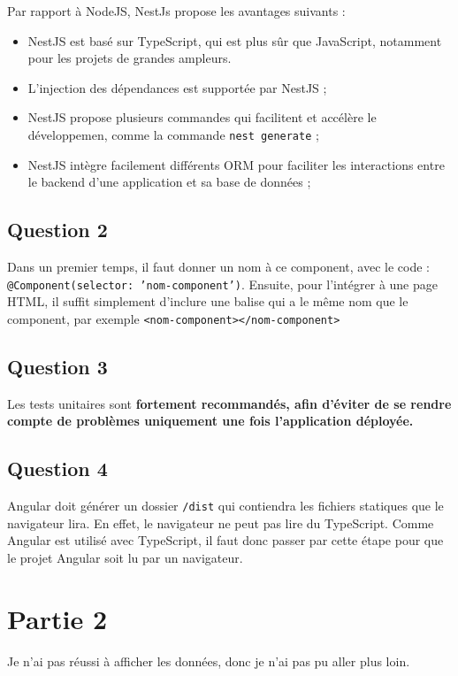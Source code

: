 \documentclass[12pt,a4paper]{article}
\begin{document}
Par rapport à NodeJS, NestJs propose les avantages suivants : \\

\begin{itemize}
	\item NestJS est basé sur TypeScript, qui est plus sûr que JavaScript, notamment pour les projets de grandes ampleurs.
	\item L'injection des dépendances est supportée par NestJS ;
	\item NestJS propose plusieurs commandes qui facilitent et accélère le développemen, comme la commande \texttt{nest generate} ;
	\item NestJS intègre facilement différents ORM pour faciliter les interactions entre le backend d'une application et sa base de données ;
\end{itemize}	
	
	\subsection*{Question 2}

Dans un premier temps, il faut donner un nom à ce component, avec le code : \\ \texttt{@Component({{selector: 'nom-component'})}}. Ensuite, pour l'intégrer à une page HTML, il suffit simplement d'inclure une balise qui a le même nom que le component, par exemple \texttt{<nom-component></nom-component>}
	
	\subsection*{Question 3}
	
Les tests unitaires sont \textbf{fortement recommandés, afin d’éviter de se rendre compte de problèmes uniquement une fois l’application déployée.}
	
	\subsection*{Question 4}

Angular doit générer un dossier \texttt{/dist} qui contiendra les fichiers statiques que le navigateur lira. En effet, le navigateur ne peut pas lire du TypeScript. Comme Angular est utilisé avec TypeScript, il faut donc passer par cette étape pour que le projet Angular soit lu par un navigateur.

\section*{Partie 2}

Je n'ai pas réussi à afficher les données, donc je n'ai pas pu aller plus loin.

\printbibliography
\end{document}
